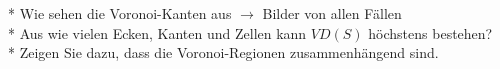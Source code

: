 * Wie sehen die Voronoi-Kanten aus $\rightarrow$ Bilder von allen Fällen\\
* Aus wie vielen Ecken, Kanten und Zellen kann $VD(S)$ höchstens bestehen?\\
* Zeigen Sie dazu, dass die Voronoi-Regionen zusammenhängend sind.